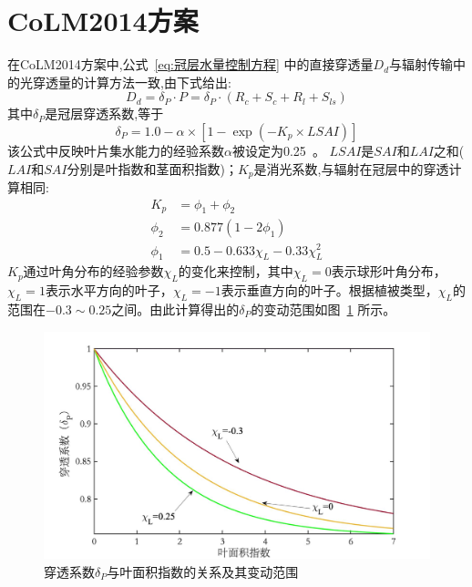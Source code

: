 \section{CoLM2014方案}
在CoLM2014方案中,公式~\eqref{eq:冠层水量控制方程} 中的直接穿透量$D_d$与辐射传输中的光穿透量的计算方法一致,由下式给出:
\begin{equation}
D_{d}=\delta_{P} \cdot P=\delta_{P} \cdot\left(R_{c}+S_{c}+R_{l}+S_{l s}\right)
\end{equation}
其中$\delta_P$是冠层穿透系数,等于
\begin{equation}
\delta_{P}=1.0-\alpha \times\left[1-\exp \left(-K_{p} \times LSAI\right)\right]
\end{equation}
该公式中反映叶片集水能力的经验系数$\alpha$被设定为0.25~\citep{lawrence2011parameterization}。
$LSAI$是$SAI$和$LAI$之和($LAI$和$SAI$分别是叶指数和茎面积指数)；$K_p$是消光系数,与辐射在冠层中的穿透计算相同:
\begin{equation}\label{eq:消光系数}
\begin{aligned}
K_{p} &= \phi_{1}+\phi_{2} \\
\phi_{2} &= 0.877\left(1-2 \phi_{1}\right) \\
\phi_{1} &= 0.5-0.633 \chi_{L}-0.33 \chi_{L}^{2}
\end{aligned}
\end{equation}
$K_p$通过叶角分布的经验参数$\chi_L$的变化来控制，其中$\chi_L=0$表示球形叶角分布，$\chi_L= 1$表示水平方向的叶子，$\chi_L= -1$表示垂直方向的叶子。根据植被类型，$\chi_L$的范围在$-0.3\sim0.25$之间。由此计算得出的$\delta_P$的变动范围如图~\ref{fig:穿透系数与叶面积指数} 所示。
{
\begin{figure}[htbp]
\centering
\includegraphics[width=1.0\textwidth]{Figures/陆地表面的水分循环/穿透系数与叶面积指数.jpg}
\caption{穿透系数$\delta_P$与叶面积指数的关系及其变动范围}
\label{fig:穿透系数与叶面积指数}
\end{figure}
}

